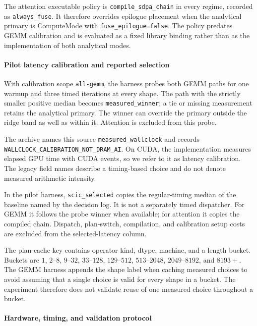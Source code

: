 \documentclass[a4paper,fleqn]{cas-dc}
\begin{document}
The attention executable policy is \texttt{compile\_sdpa\_chain} in every regime, recorded as \texttt{always\_fuse}.
It therefore overrides epilogue placement when the analytical primary is ComputeMode with \texttt{fuse\_epilogue=false}.
The policy predates GEMM calibration and is evaluated as a fixed library binding rather than as the implementation of both analytical modes.

\paragraph{Pilot latency calibration and reported selection}

With calibration scope \texttt{all-gemm}, the harness probes both GEMM paths for one warmup and three timed iterations at every shape.
The path with the strictly smaller positive median becomes \texttt{measured\_winner}; a tie or missing measurement retains the analytical primary.
The winner can override the primary outside the ridge band as well as within it.
Attention is excluded from this probe.

The archive names this source \texttt{measured\_wallclock} and records \texttt{WALLCLOCK\_\allowbreak CALIBRATION\_\allowbreak NOT\_\allowbreak DRAM\_\allowbreak AI}.
On CUDA, the implementation measures elapsed GPU time with CUDA events, so we refer to it as latency calibration.
The legacy field names describe a timing-based choice and do not denote measured arithmetic intensity.

In the pilot harness, \texttt{scic\_selected} copies the regular-timing median of the baseline named by the decision log.
It is not a separately timed dispatcher.
For GEMM it follows the probe winner when available; for attention it copies the compiled chain.
Dispatch, plan-switch, compilation, and calibration setup costs are excluded from the selected-latency column.

The plan-cache key contains operator kind, dtype, machine, and a length bucket.
Buckets are $1$, $2$--$8$, $9$--$32$, $33$--$128$, $129$--$512$, $513$--$2048$, $2049$--$8192$, and $8193+$.
The GEMM harness appends the shape label when caching measured choices to avoid assuming that a single choice is valid for every shape in a bucket.
The experiment therefore does not validate reuse of one measured choice throughout a bucket.

\paragraph{Hardware, timing, and validation protocol}
\end{document}
